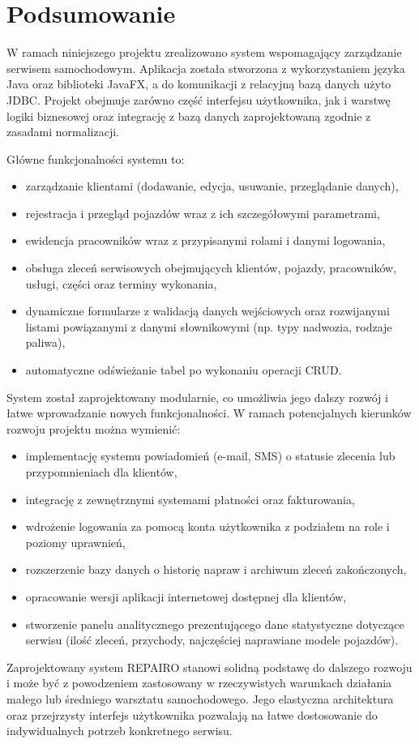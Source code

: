\chapter{Podsumowanie }
\label{cha:podsumowanie}

W ramach niniejszego projektu zrealizowano system wspomagający zarządzanie serwisem samochodowym. Aplikacja została stworzona z wykorzystaniem języka Java oraz biblioteki JavaFX, a do komunikacji z relacyjną bazą danych użyto JDBC. Projekt obejmuje zarówno część interfejsu użytkownika, jak i warstwę logiki biznesowej oraz integrację z bazą danych zaprojektowaną zgodnie z zasadami normalizacji.

Główne funkcjonalności systemu to:

\begin{itemize}
  \item zarządzanie klientami (dodawanie, edycja, usuwanie, przeglądanie danych),
  \item rejestracja i przegląd pojazdów wraz z ich szczegółowymi parametrami,
  \item ewidencja pracowników wraz z przypisanymi rolami i danymi logowania,
  \item obsługa zleceń serwisowych obejmujących klientów, pojazdy, pracowników, usługi, części oraz terminy wykonania,
  \item dynamiczne formularze z walidacją danych wejściowych oraz rozwijanymi listami powiązanymi z danymi słownikowymi (np. typy nadwozia, rodzaje paliwa),
  \item automatyczne odświeżanie tabel po wykonaniu operacji CRUD.
\end{itemize}


System został zaprojektowany modularnie, co umożliwia jego dalszy rozwój i łatwe wprowadzanie nowych funkcjonalności. W ramach potencjalnych kierunków rozwoju projektu można wymienić:

\begin{itemize}
  \item implementację systemu powiadomień (e-mail, SMS) o statusie zlecenia lub przypomnieniach dla klientów,
  \item integrację z zewnętrznymi systemami płatności oraz fakturowania,
  \item wdrożenie logowania za pomocą konta użytkownika z podziałem na role i poziomy uprawnień,
  \item rozszerzenie bazy danych o historię napraw i archiwum zleceń zakończonych,
  \item opracowanie wersji aplikacji internetowej dostępnej dla klientów,
  \item stworzenie panelu analitycznego prezentującego dane statystyczne dotyczące serwisu (ilość zleceń, przychody, najczęściej naprawiane modele pojazdów).
\end{itemize}

Zaprojektowany system REPAIRO stanowi solidną podstawę do dalszego rozwoju i może być z powodzeniem zastosowany w rzeczywistych warunkach działania małego lub średniego warsztatu samochodowego. Jego elastyczna architektura oraz przejrzysty interfejs użytkownika pozwalają na łatwe dostosowanie do indywidualnych potrzeb konkretnego serwisu.
